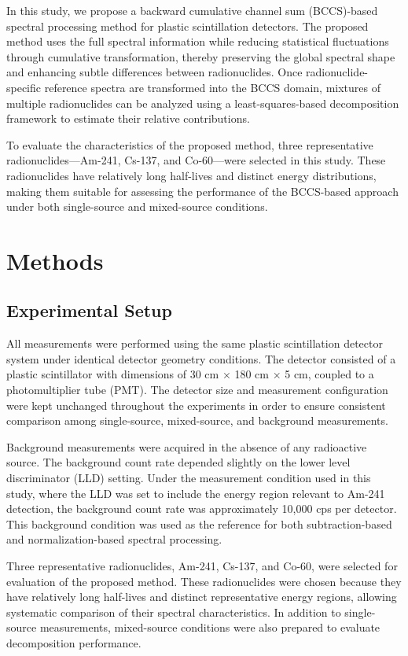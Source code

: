 \documentclass[10pt]{wlscirep}
\begin{document}
In this study, we propose a backward cumulative channel sum (BCCS)-based spectral processing method for plastic scintillation detectors. The proposed method uses the full spectral information while reducing statistical fluctuations through cumulative transformation, thereby preserving the global spectral shape and enhancing subtle differences between radionuclides. Once radionuclide-specific reference spectra are transformed into the BCCS domain, mixtures of multiple radionuclides can be analyzed using a least-squares-based decomposition framework to estimate their relative
contributions.

To evaluate the characteristics of the proposed method, three representative radionuclides—Am-241, Cs-137, and Co-60—were selected in this study. These radionuclides have relatively long half-lives and distinct energy distributions, making them suitable for assessing the performance of the BCCS-based approach under both single-source and mixed-source conditions.

\section*{Methods}
\subsection*{Experimental Setup}

All measurements were performed using the same plastic scintillation detector system under identical detector geometry conditions. The detector consisted of a plastic scintillator
with dimensions of 30 cm $\times$ 180 cm $\times$ 5 cm, coupled to a photomultiplier tube (PMT). The
detector size and measurement configuration were kept unchanged throughout the experiments in order to ensure consistent comparison among single-source, mixed-source, and background measurements.

Background measurements were acquired in the absence of any radioactive source. The background count rate depended slightly on the lower level discriminator (LLD) setting. Under the measurement condition used in this study, where the LLD was set to include the energy region relevant to Am-241 detection, the background count rate was approximately 10,000 cps per detector. This background condition was used as the reference for both subtraction-based and normalization-based spectral processing.

Three representative radionuclides, Am-241, Cs-137, and Co-60, were selected for evaluation of the proposed method. These radionuclides were chosen because they have relatively long half-lives and distinct representative energy regions, allowing systematic comparison of their spectral characteristics. In addition to single-source measurements, mixed-source conditions were also prepared to evaluate decomposition performance.
\end{document}
